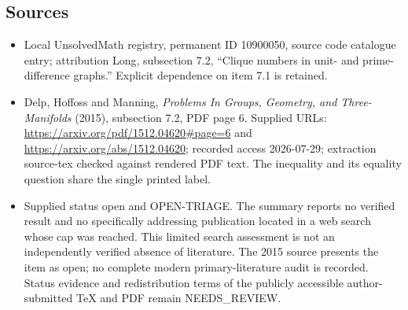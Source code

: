 \documentclass[11pt]{article}
\begin{document}
\subsection{Sources}
\begin{itemize}
\item Local UnsolvedMath registry, permanent ID 10900050, source code catalogue entry; attribution Long, subsection 7.2, ``Clique numbers in unit- and prime-difference graphs.'' Explicit dependence on item 7.1 is retained.
\item Delp, Hoffoss and Manning, \emph{Problems In Groups, Geometry, and Three-Manifolds} (2015), subsection 7.2, PDF page 6. Supplied URLs: \url{https://arxiv.org/pdf/1512.04620#page=6} and \url{https://arxiv.org/abs/1512.04620}; recorded access 2026-07-29; extraction source-tex checked against rendered PDF text. The inequality and its equality question share the single printed label.
\item Supplied status open and OPEN-TRIAGE. The summary reports no verified result and no specifically addressing publication located in a web search whose cap was reached. This limited search assessment is not an independently verified absence of literature. The 2015 source presents the item as open; no complete modern primary-literature audit is recorded. Status evidence and redistribution terms of the publicly accessible author-submitted TeX and PDF remain NEEDS\_REVIEW.
\end{itemize}
\end{document}
